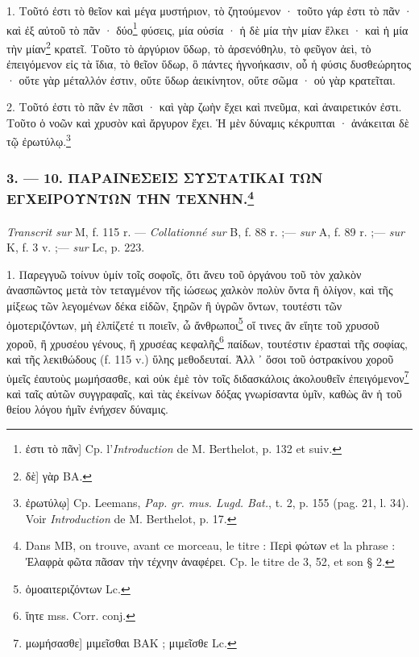\documentclass[a4paper, 11pt, oneside, polutonikogreek, french]{article}
\begin{document}
\bigskip

1. Τοῦτό ἐστι τὸ θεῖον καὶ μέγα μυστήριον, τὸ ζητούμενον · τοῦτο γάρ ἐστι τὸ πᾶν · καὶ ἐξ αὐτοῦ τὸ πᾶν · δύο\footnote{ἐστι τὸ πᾶν] Cp. l'\emph{Introduction} de M. Berthelot, p. 132 et suiv.} φύσεις, μία οὐσία · ἡ δὲ μία τὴν μίαν ἕλκει · καὶ ἡ μία τὴν μίαν\footnote{δὲ] γὰρ BA.} κρατεῖ. Τοῦτο τὸ ἀργύριον ὕδωρ, τὸ ἀρσενόθηλυ, τὸ φεῦγον ἀεὶ, τὸ ἐπειγόμενον εἰς τὰ ἴδια, τὸ θεῖον ὕδωρ, ὃ πάντες ἠγνοήκασιν, οὗ ἡ φύσις δυσθεώρητος · οὔτε γὰρ μέταλλόν ἐστιν, οὔτε ὕδωρ ἀεικίνητον, οὔτε σῶμα · οὐ γὰρ κρατεῖται.

2. Τοῦτό ἐστι τὸ πᾶν ἐν πᾶσι · καὶ γὰρ ζωὴν ἔχει καὶ πνεῦμα, καὶ ἀναιρετικόν ἐστι. Τοῦτο ὁ νοῶν καὶ χρυσὸν καὶ ἄργυρον ἔχει. Ἡ μὲν δύναμις κέκρυπται · ἀνάκειται δὲ τῷ ἐρωτύλῳ.\footnote{ἐρωτύλῳ] Cp. Leemans, \emph{Pap. gr. mus. Lugd. Bat.}, t. 2, p. 155 (pag. 21, l. 34). Voir \emph{Introduction} de M. Berthelot, p. 17.}

\bigskip
\centerline{\EightStarTaper}
\centerline{\EightStarTaper\EightStarTaper}
\bigskip

\subsubsection[3. --- 10. ΠΑΡΑΙΝΕΣΕΙΣ ΣΥΣΤΑΤΙΚΑΙ ΤΩΝ ΕΓΧΕΙΡΟΥΝΤΩΝ ΤΗΝ ΤΕΧΝΗΝ.]{3. --- 10. ΠΑΡΑΙΝΕΣΕΙΣ ΣΥΣΤΑΤΙΚΑΙ ΤΩΝ ΕΓΧΕΙΡΟΥΝΤΩΝ ΤΗΝ ΤΕΧΝΗΝ.\footnote{Dans MB, on trouve, avant ce morceau, le titre : Περὶ φώτων et la phrase : Ἐλαφρὰ φῶτα πᾶσαν τὴν τέχνην ἀναφέρει. Cp. le titre de 3, 52, et son § 2.}}
\paragraph{}
\emph{Transcrit sur} M, f. 115 r. --- \emph{Collationné sur} B, f. 88 r. ;--- \emph{sur} A, f. 89 r. ;--- \emph{sur} K, f. 3 v. ;--- \emph{sur} Lc, p. 223.

\bigskip

1. Παρεγγυῶ τοίνυν ὑμίν τοῖς σοφοῖς, ὅτι ἄνευ τοῦ ὀργάνου τοῦ τὸν χαλκὸν ἀνασπῶντος μετὰ τὸν τεταγμένον τῆς ἰώσεως χαλκὸν πολὺν ὄντα ἢ ὀλίγον, καὶ τῆς μίξεως τῶν λεγομένων δέκα εἰδῶν, ξηρῶν ἢ ὑγρῶν ὅντων, τουτέστι τῶν ὁμοτεριζόντων, μὴ ἐλπίζετέ τι ποιεῖν, ὦ ἄνθρωποι\footnote{ὁμοαιτεριζόντων Lc.} οἵ τινες ἂν εἴητε τοῦ χρυσοῦ χοροῦ, ἢ χρυσέου γένους, ἢ χρυσέας κεφαλῆς\footnote{ἴητε mss. Corr. conj.} παίδων, τουτέστιν ἐρασταὶ τῆς σοφίας, καὶ τῆς λεκιθώδους (f. 115 v.) ὕλης μεθοδευταί. Ἀλλ ᾽ ὅσοι τοῦ ὀστρακίνου χοροῦ ὑμεῖς ἐαυτοὺς μωμήσασθε, καὶ οὐκ ἐμὲ τὸν τοῖς διδασκάλοις ἀκολουθεῖν ἐπειγόμενον\footnote{μωμήσασθε] μιμεῖσθαι BAK ; μιμεῖσθε Lc.} καὶ ταῖς αὐτῶν συγγραφαῖς, καὶ τὰς ἐκείνων δόξας γνωρίσαντα ὑμῖν, καθὼς ἂν ἡ τοῦ θείου λόγου ἡμῖν ἐνήχσεν δύναμις.
\end{document}

